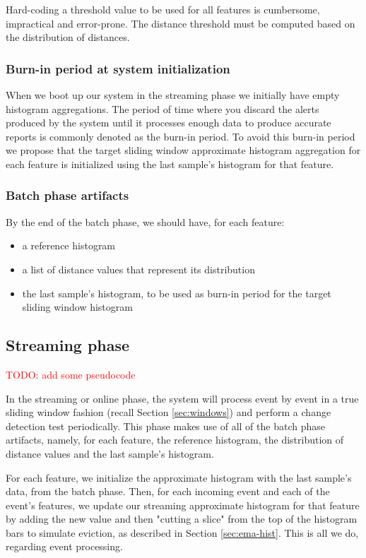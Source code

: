 Hard-coding a threshold value to be used for all features is cumbersome, impractical and error-prone. The distance threshold must be computed based on the distribution of distances.


\subsubsection*{Burn-in period at system initialization}
When we boot up our system in the streaming phase we initially have empty histogram aggregations. The period of time where you discard the alerts produced by the system until it processes enough data to produce accurate reports is commonly denoted as the burn-in period. To avoid this burn-in period we propose that the target sliding window approximate histogram aggregation for each feature is initialized using the last sample's histogram for that feature.

\subsubsection*{Batch phase artifacts}
By the end of the batch phase, we should have, for each feature: 
\begin{itemize}
    \item a reference histogram
    \item a list of distance values that represent its distribution
    \item the last sample's histogram, to be used as burn-in period for the target sliding window histogram
\end{itemize}

\subsection{Streaming phase} \label{sec:stream-phase}
\textcolor{red}{TODO: add some pseudocode}

In the streaming or online phase, the system will process event by event in a true sliding window fashion (recall Section \ref{sec:windows}) and perform a change detection test periodically. This phase makes use of all of the batch phase artifacts, namely, for each feature, the reference histogram, the distribution of distance values and the last sample's histogram.

For each feature, we initialize the approximate histogram with the last sample's data, from the batch phase. Then, for each incoming event and each of the event's features, we update our streaming approximate histogram for that feature by adding the new value and then "cutting a slice" from the top of the histogram bars to simulate eviction, as described in Section \ref{sec:ema-hist}. This is all we do, regarding event processing.

